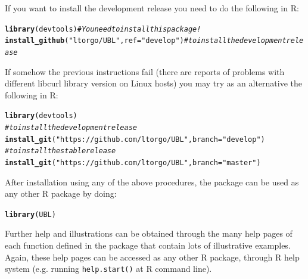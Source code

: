 \documentclass[10pt,a4paper]{article}\usepackage[]{graphicx}\usepackage[]{color}
\makeatletter
\newcommand{\hlstr}[1]{\textcolor[rgb]{0.192,0.494,0.8}{#1}}%
\newcommand{\hlcom}[1]{\textcolor[rgb]{0.678,0.584,0.686}{\textit{#1}}}%
\newcommand{\hlstd}[1]{\textcolor[rgb]{0.345,0.345,0.345}{#1}}%
\newcommand{\hlkwc}[1]{\textcolor[rgb]{0.333,0.667,0.333}{#1}}%
\newcommand{\hlkwd}[1]{\textcolor[rgb]{0.737,0.353,0.396}{\textbf{#1}}}%
\newenvironment{kframe}{%
 \def\at@end@of@kframe{}%
 \ifinner\ifhmode%
  \def\at@end@of@kframe{\end{minipage}}%
  \begin{minipage}{\columnwidth}%
 \fi\fi%
 \def\FrameCommand##1{\hskip\@totalleftmargin \hskip-\fboxsep
 \colorbox{shadecolor}{##1}\hskip-\fboxsep
     \hskip-\linewidth \hskip-\@totalleftmargin \hskip\columnwidth}%
 \MakeFramed {\advance\hsize-\width
   \@totalleftmargin\z@ \linewidth\hsize
   \@setminipage}}%
 {\par\unskip\endMakeFramed%
 \at@end@of@kframe}
\newenvironment{knitrout}{}{} %
\makeatother
\begin{document}
If you want to install the development release you need to do the following in R:

\begin{knitrout}\footnotesize
{}\color{fgcolor}\begin{kframe}
\begin{alltt}
\hlkwd{library}\hlstd{(devtools)}  \hlcom{# You need to install this package!}
\hlkwd{install_github}\hlstd{(}\hlstr{"ltorgo/UBL"}\hlstd{,}\hlkwc{ref}\hlstd{=}\hlstr{"develop"}\hlstd{)} \hlcom{# to install the development release}
\end{alltt}
\end{kframe}
\end{knitrout}


If somehow the previous instructions fail (there are reports of problems with different libcurl library version on Linux hosts) you may try as an alternative the following in R:
\begin{knitrout}\footnotesize
{}\color{fgcolor}\begin{kframe}
\begin{alltt}
\hlkwd{library}\hlstd{(devtools)}
\hlcom{# to install the development release}
\hlkwd{install_git}\hlstd{(}\hlstr{"https://github.com/ltorgo/UBL"}\hlstd{,}\hlkwc{branch}\hlstd{=}\hlstr{"develop"}\hlstd{)}
\hlcom{# to install the stable release}
\hlkwd{install_git}\hlstd{(}\hlstr{"https://github.com/ltorgo/UBL"}\hlstd{,}\hlkwc{branch}\hlstd{=}\hlstr{"master"}\hlstd{)}
\end{alltt}
\end{kframe}
\end{knitrout}

After installation using any of the above procedures, the package can be used as any other R package by doing:

\begin{knitrout}\footnotesize
{}\color{fgcolor}\begin{kframe}
\begin{alltt}
\hlkwd{library}\hlstd{(UBL)}
\end{alltt}
\end{kframe}
\end{knitrout}

Further help and illustrations can be obtained through the many help pages of each function defined in the package that contain lots of illustrative examples. Again, these help pages can be accessed as any other R package, through R help system (e.g. running \texttt{help.start()} at R command line).
\end{document}
